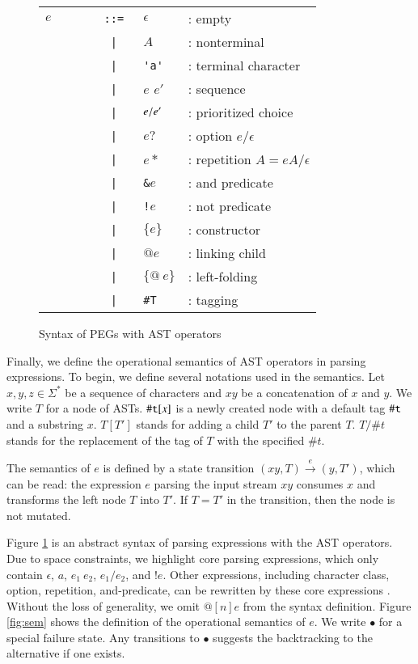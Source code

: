 \documentclass[JIP]{ipsj}
\begin{document}
\begin{figure}[tb]
\begin{center}
\begin{tabular}{|lrll|} \hline
$e$ &  \verb|      ::= | & $\epsilon$ & : empty \\ 
& \verb#|  # & $A$ & : nonterminal  \\
& \verb#|  # & \verb|'a'| & : terminal character \\
& \verb#|  # & $e$ $e' $ &  : sequence \\
& \verb#|  # & $e {\tt /} e' $ &  : prioritized choice \\
& \verb#|  # & $e?$ &  : option $e/\epsilon$  \\
& \verb#|  # & $e*$ &  : repetition $A = e A /\epsilon$ \\
& \verb#|  # & \verb|&|$e$ & : and predicate  \\
& \verb#|  # & \verb|!|$e$ & : not predicate  \\
& \verb#|  # & $\{ e \}$ & : constructor  \\
& \verb#|  # & $@e$ & : linking child  \\
& \verb#|  # & $\{@ ~e \}$ & : left-folding \\
& \verb#|  # & \verb|#T| & : tagging  \\
\hline
\end{tabular}
\end{center}
\caption{Syntax of PEGs with AST operators}
\label{fig:syntax}
\end{figure}

Finally, we define the operational semantics of AST operators in parsing expressions. To begin, we define several notations used in the semantics. Let $x,y,z \in \Sigma^*$ be a sequence of characters and $xy$ be a concatenation of $x$ and $y$. We write $T$ for a node of ASTs. $\#{\tt t}[x]$ is a newly created node with a default tag $\#{\tt t}$ and a substring $x$. $T[T']$ stands for adding a child $T'$ to the parent $T$. $T/\#t$ stands for the replacement of the tag of $T$ with the specified $\#t$.

The semantics of $e$ is defined by a state transition $(xy, T)  \xrightarrow{e} (y, T')$, which can be read: the expression $e$ parsing the input stream $xy$ consumes $x$ and transforms the left node $T$ into $T'$. If $T = T'$ in the transition, then the node is not mutated.   


Figure \ref{fig:syntax} is an abstract syntax of parsing expressions with the AST operators. Due to space constraints, we highlight core parsing expressions, which only contain $\epsilon$, $a$, $e_1 ~ e_2$, $e_1 / e_2$, and $!e$. Other expressions, including character class, option, repetition, and-predicate, can be rewritten by these core expressions \cite{POPL04_PEG}. Without the loss of generality, we omit $@[n]e$ from the syntax definition. Figure \ref{fig:sem} shows the definition of the operational semantics of $e$. We write $\bullet$ for a special failure state. Any transitions to $\bullet$ suggests the backtracking to the alternative if one exists. 
\end{document}
